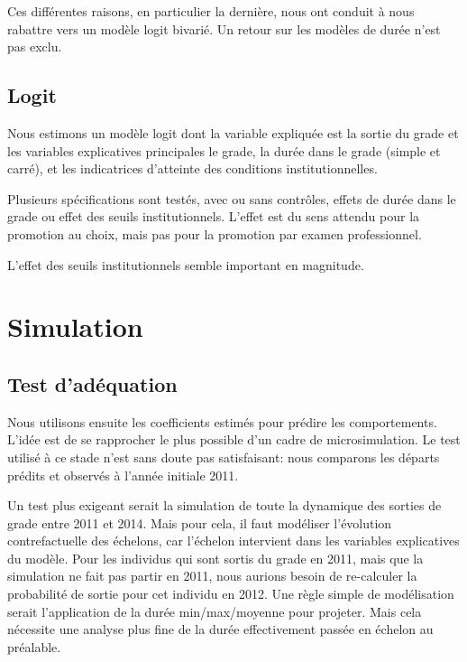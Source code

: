 \documentclass[11pt,a4paper]{article}
\begin{document}
Ces différentes raisons, en particulier la dernière, nous ont conduit à nous rabattre vers un modèle logit bivarié. Un retour sur les modèles de durée n'est pas exclu. 

\subsection*{Logit} 

Nous estimons un modèle logit dont la variable expliquée est la sortie du grade et les variables explicatives principales le grade, la durée dans le grade (simple et carré), et les indicatrices d'atteinte des conditions institutionnelles. 

Plusieurs spécifications sont testés, avec ou sans contrôles, effets de durée dans le grade ou effet des seuils institutionnels. 
L'effet est du sens attendu pour la promotion au choix, mais pas pour la promotion par examen professionnel. 

L'effet des seuils institutionnels semble important en magnitude.  %

\section{Simulation}


\subsection*{Test d'adéquation} 

Nous utilisons ensuite les coefficients estimés pour prédire les comportements. L'idée est de se rapprocher le plus possible d'un cadre de microsimulation. Le test utilisé à ce stade n'est sans doute pas satisfaisant: nous comparons les départs prédits et observés à l'année initiale 2011. 

Un test plus exigeant serait la simulation de toute la dynamique des sorties de grade entre 2011 et 2014. Mais pour cela, il faut modéliser l'évolution contrefactuelle des échelons, car l'échelon intervient dans les variables explicatives du modèle. Pour les individus qui sont sortis du grade en 2011, mais que la simulation ne fait pas partir en 2011, nous aurions besoin de re-calculer la probabilité de sortie pour cet individu en 2012. Une règle simple de modélisation serait l'application de la durée min/max/moyenne pour projeter. Mais cela nécessite une analyse plus fine de la durée effectivement passée en échelon au préalable. 
\end{document}
